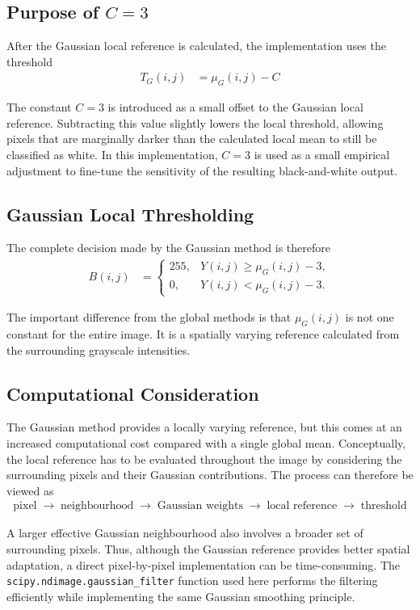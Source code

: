 \subsection{Purpose of $C=3$}

After the Gaussian local reference is calculated, the implementation
uses the threshold
\begin{align}
T_G(i,j)&=\mu_G(i,j)-C\label{eq:gaussian_threshold}
\end{align}

The constant $C=3$ is introduced as a small offset to the Gaussian local
reference. Subtracting this value slightly lowers the local threshold,
allowing pixels that are marginally darker than the calculated local mean
to still be classified as white. In this implementation, $C=3$ is used
as a small empirical adjustment to fine-tune the sensitivity of the
resulting black-and-white output.
\vspace*{\baselineskip}
\subsection{Gaussian Local Thresholding}

The complete decision made by the Gaussian method is therefore
\begin{align}
B(i,j)&=
\begin{cases}
255, & Y(i,j)\geq\mu_G(i,j)-3,\\
0, & Y(i,j)<\mu_G(i,j)-3.
\end{cases}\label{eq:gaussian_bw_threshold}
\end{align}

The important difference from the global methods is that $\mu_G(i,j)$
is not one constant for the entire image. It is a spatially varying
reference calculated from the surrounding grayscale intensities.
\vspace*{\baselineskip}
\subsection{Computational Consideration}

The Gaussian method provides a locally varying reference, but this comes
at an increased computational cost compared with a single global mean.
Conceptually, the local reference has to be evaluated throughout the
image by considering the surrounding pixels and their Gaussian
contributions. The process can therefore be viewed as
\begin{align}
\text{pixel}\;\rightarrow\;\text{neighbourhood}
\;\rightarrow\;\text{Gaussian weights}
\;\rightarrow\;\text{local reference}
\;\rightarrow\;\text{threshold}\label{eq:gaussian_pipeline}
\end{align}

A larger effective Gaussian neighbourhood also involves a broader set
of surrounding pixels. Thus, although the Gaussian reference provides
better spatial adaptation, a direct pixel-by-pixel implementation can be
time-consuming. The \texttt{scipy.ndimage.gaussian\_filter} function used
here performs the filtering efficiently while implementing the same
Gaussian smoothing principle.
